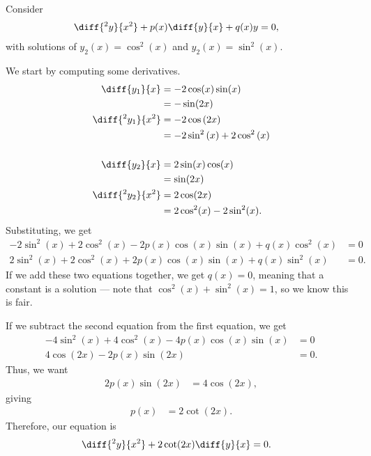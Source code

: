 \documentclass[10pt]{mypackage}
\begin{document}
\begin{example}
  Consider
  \begin{align*}
    \diff{^2y}{x^2} + p(x) \diff{y}{x} + q(x)y &= 0,
  \end{align*}
  with solutions of $y_2(x) = \cos^2\left( x \right)$ and $y_2(x) = \sin^2\left( x \right)$.\newline

  We start by computing some derivatives.
  \begin{align*}
    \diff{y_1}{x} &= -2\cos(x)\sin(x)\\
            &= -\sin(2x)\\
    \diff{^2y_1}{x^2} &= -2\cos\left( 2x \right)\\
             &= -2\sin^2\left( x \right) + 2\cos^2\left( x \right)\\
             \\
    \diff{y_2}{x} &= 2\sin(x)\cos(x)\\
                  &= \sin(2x)\\
    \diff{^2y_2}{x^2} &= 2\cos(2x)\\
                      &= 2\cos^2(x)-2\sin^2(x).
  \end{align*}
  Substituting, we get
  \begin{align*}
    -2\sin^2(x) + 2\cos^2(x) - 2p(x)\cos(x)\sin(x) + q(x)\cos^2(x) &= 0\\
    2\sin^2(x) + 2\cos^2(x) + 2p(x)\cos(x)\sin(x) + q(x)\sin^2(x) &= 0.
  \end{align*}
  If we add these two equations together, we get $q(x) = 0$, meaning that a constant is a solution --- note that $\cos^2(x) + \sin^2(x) = 1$, so we know this is fair.\newline

  If we subtract the second equation from the first equation, we get
  \begin{align*}
    -4\sin^2(x) + 4\cos^2(x) - 4p(x)\cos(x)\sin(x) &= 0\\
    4\cos(2x) - 2p(x)\sin(2x) &= 0.
  \end{align*}
  Thus, we want
  \begin{align*}
    2p(x)\sin(2x) &= 4\cos(2x),
  \end{align*}
  giving
  \begin{align*}
    p(x) &= 2\cot(2x).
  \end{align*}
  Therefore, our equation is
  \begin{align*}
    \diff{^2y}{x^2} + 2\cot(2x)\diff{y}{x} &= 0.
  \end{align*}
\end{example}
\end{document}
